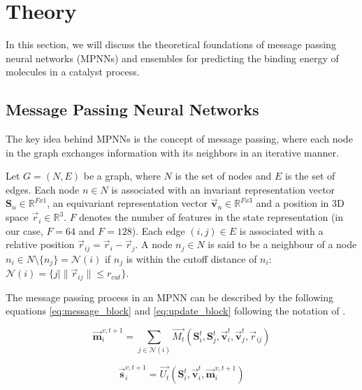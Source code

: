 \section{Theory}\label{sec:theory}

In this section, we will discuss the theoretical foundations of message passing neural networks (MPNNs) and ensembles for predicting
the binding energy of molecules in a catalyst process.

\subsection{Message Passing Neural Networks}\label{subsec:modelling_task}

The key idea behind MPNNs is the concept of
message passing, where each node in the graph exchanges information with its neighbors in an iterative manner.

Let $G = (N, E)$ be a graph, where $N$ is the set of nodes and $E$ is the set of edges.
Each node $n \in N$ is associated with an invariant representation vector $\mathbf{S}_{n} \in \mathbb{R}^{Fx1}$,
an equivariant representation
vector $\vec{\mathbf{v}}_{n} \in \mathbb{R}^{Fx3}$ and a position in 3D space $\vec{r}_{i} \in \mathbb{R}^3$.
$F$ denotes the number of features in the state representation (in our case, $F = 64$ and $F = 128$).
Each edge $(i, j) \in E$ is associated with a relative position $\vec{r}_{ij} = \vec{r}_{i} - \vec{r}_{j}$.
A node $n_{j} \in N$ is said to be a neighbour of a node $n_{i} \in N \setminus \{n_{j}\} = \mathcal{N}(i) $
if $n_{j}$ is within the cutoff distance of $n_{i}$: $\mathcal{N}(i) = \{j |\lVert \vec{r}_{ij} \rVert \leq r_{cut}  \}$.


The message passing process in an MPNN can be described by the following equations \ref{eq:message_block} and \ref{eq:update_block}
following the notation of \cite{PAINN}.

\begin{equation}\label{eq:message_block}
    \vec{\mathbf{m}}_{i}^{v,t+1} = \sum_{j \in \mathcal{N}(i)} \vec{M_t}(\mathbf{S}_{i}^{t}, \mathbf{S}_{j}^{t}, \vec{\mathbf{v}}_{i}^{t}, \vec{\mathbf{v}}_{j}^{t}, \vec{r}_{ij})
\end{equation}

\begin{equation}\label{eq:update_block}
    \vec{\mathbf{s}}_{i}^{v,t+1} = \vec{U_t}(\mathbf{S}_{i}^{t}, \vec{\mathbf{v}}_{i}^{t}, \vec{\mathbf{m}}_{i}^{v,t+1})
\end{equation}

